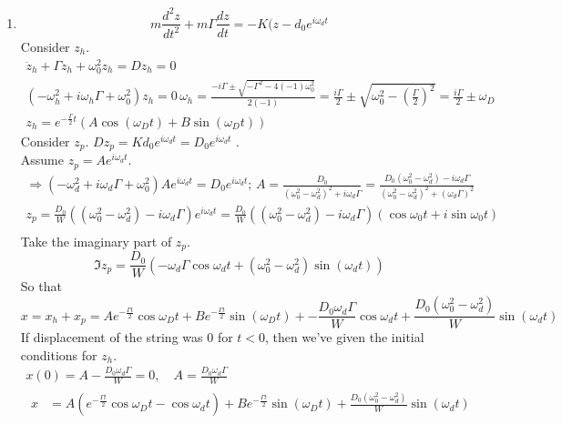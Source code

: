 \documentclass[twoside,10pt]{amsart}
\newcommand{\problemhead}[1]
  {\smallskip
   \noindent{\large\bf Problem #1.}
   \smallskip}
\begin{document}
\problemhead{2.4}  
\begin{enumerate}
\item 
\[
m \frac{d^2 z }{dt^2 } + m \Gamma \frac{dz}{dt} = - K (z - d_0 e^{i\omega_d t }  
\]
Consider $z_h$.  
\[
\begin{gathered}
  \ddot{z}_h + \Gamma \dot{z}_h + \omega_0^2 z_h = Dz_h =0 \\
  (-\omega_h^2 + i \omega_h \Gamma + \omega_0^2) z_h  =0 \, \omega_h = \frac{ -i \Gamma \pm \sqrt{ -\Gamma^2 -4 (-1)\omega_0^2 } }{ 2 (-1)} = \frac{ i\Gamma}{2} \pm \sqrt{ \omega_0^2 - \left( \frac{\Gamma}{2} \right)^2 } = \frac{ i\Gamma}{2} \pm \omega_D  \\
    z_h = e^{ -\frac{\Gamma}{2} t } (A \cos{ (\omega_D t) } + B \sin{ (\omega_D t )})  
\end{gathered}
\]
Consider $z_p$.  $D z_p = Kd_0 e^{i\omega_d t } = D_0 e^{i\omega_d t } $ .  \bigskip \\
Assume $z_p = A e^{i\omega_d t }$.  
\[
\begin{gathered}
  \Longrightarrow (-\omega_d^2 + i \omega_d \Gamma + \omega_0^2 ) A e^{i\omega_d t } = D_0 e^{i\omega_d t }; \, A = \frac{ D_0 }{ (\omega_0^2 - \omega_d^2)^2 + i\omega_d \Gamma } = \frac{ D_0 (\omega_0^2 - \omega_d^2) - i\omega_d \Gamma }{ (\omega_0^2 - \omega_d^2)^2 + (\omega_d \Gamma)^2 }  \\
  z_p = \frac{ D_0}{W} ((\omega_0^2 - \omega_d^2 ) - i\omega_d \Gamma )e^{i\omega_d t } =  \frac{ D_0}{W} ((\omega_0^2 - \omega_d^2 ) - i\omega_d \Gamma )(\cos{\omega_0 t } + i \sin{\omega_0 t })  \\
\end{gathered}
\]
Take the imaginary part of $z_p$.  
\[
\Im z_p = \frac{D_0}{W} (-\omega_d \Gamma \cos{\omega_d t} + (\omega_0^2 - \omega_d^2 ) \sin{ (\omega_d t ) } )
\]
So that
\[
  x = x_h + x_p = A e^{ - \frac{ \Gamma t }{ 2} } \cos{ \omega_D t } + B e^{ - \frac{ \Gamma t }{ 2 } } \sin{ (\omega_D t ) } + - \frac{ D_0 \omega_d \Gamma}{ W} \cos{ \omega_d t } + \frac{ D_0 (\omega_0^2 - \omega_d^2 ) }{ W} \sin{ (\omega_d t ) }  
\]
If displacement of the string was $0$ for $ t < 0 $, then we've given the initial conditions for $z_h$.  
\[
\begin{gathered}
  x(0) = A - \frac{ D_0 \omega_d \Gamma}{ W} = 0 , \quad A = \frac{ D_0 \omega_d \Gamma}{ W}  \\
\begin{aligned}
  x &= A (e^{- \frac{ \Gamma t}{ 2 } } \cos{\omega_D t } - \cos{ \omega_d t } ) + B e^{ -\frac{ \Gamma t }{ 2 } } \sin{ (\omega_D t )} + \frac{ D_0 (\omega_0^2 - \omega_d^2 )}{ W} \sin{ (\omega_d t )}  \\

\end{aligned}
\end{gathered}\]
\end{enumerate}
\end{document}
